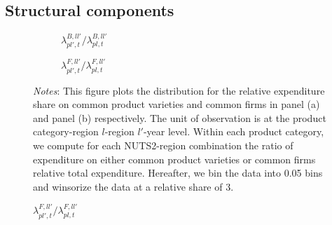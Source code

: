 \subsection{Structural components}
\begin{figure}[H]
    \centering
    \caption{Relative expenditure shares}
    \label{fig: struc_est_rel_share}
    \begin{subfigure}[t]{.49\textwidth}
         \centering
         \caption{$\lambda^{B,ll'}_{pl',t}\bigg/\lambda^{B,ll'}_{pl,t}$}
         \label{fig: feenstra_bar}
         \scalebox{0.45}{}
     \end{subfigure}
     \begin{subfigure}[t]{.49\textwidth}
         \centering
         \caption{$\lambda^{F,ll'}_{pl',t}\bigg/\lambda^{F,ll'}_{pl,t}$}
         \label{fig: feenstra_firm}
         \scalebox{0.45}{}
     \end{subfigure}
     \parbox{\textwidth}{
        \begin{spacing}{1} 
            {\footnotesize 
            \textit{Notes}: This figure plots the distribution for the relative expenditure share on common product varieties and common firms in panel (a) and panel (b) respectively. The unit of observation is at the product category-region $l$-region $l'$-year level. Within each product category, we compute for each NUTS2-region combination the ratio of expenditure on either common product varieties or common firms relative total expenditure. Hereafter, we bin the data into 0.05 bins and winsorize the data at a relative share of 3.}
        \end{spacing}}
\end{figure} 
